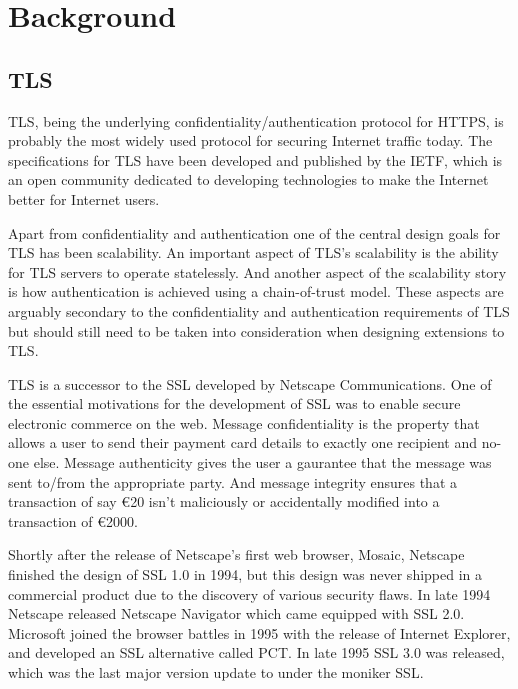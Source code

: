 \chapter{Background}

\section{TLS}

\ac{TLS}, being the underlying confidentiality/authentication protocol for \ac{HTTPS},
is probably the most widely used protocol for securing Internet traffic today.
The specifications for \ac{TLS} have been developed and published by the \ac{IETF},
which is an open community dedicated to developing technologies to make the Internet better
for Internet users.


Apart from confidentiality and authentication one of the central
design goals for \ac{TLS} has been scalability.
An important aspect of \ac{TLS}'s scalability is the ability
for \ac{TLS} servers to operate statelessly.
And another aspect of the scalability story is how
authentication is achieved using a chain-of-trust model.
These aspects are arguably secondary to the confidentiality and authentication
requirements of \ac{TLS} but should still need to be taken into consideration
when designing extensions to \ac{TLS}.

\ac{TLS} is a successor to the \ac{SSL} developed
by Netscape Communications.
One of the essential motivations for the development of \ac{SSL}
was to enable secure electronic commerce on the web.
Message confidentiality is the property that allows a user
to send their payment card details to exactly one recipient and no-one else.
Message authenticity gives the user a gaurantee that the message
was sent to/from the appropriate party.
And message integrity ensures that a transaction of say €20 isn't
maliciously or accidentally modified into a transaction of €2000.

Shortly after the release of Netscape's first web browser, Mosaic,
Netscape finished the design of \ac{SSL} 1.0 in 1994,
but this design was never shipped in a commercial product
due to the discovery of various security flaws.
In late 1994 Netscape released Netscape Navigator which
came equipped with \ac{SSL} 2.0.
Microsoft joined the browser battles in 1995 with the release
of Internet Explorer, and developed an \ac{SSL} alternative
called \ac{PCT}.
In late 1995 \ac{SSL} 3.0 was released, which was the last
major version update to under the moniker \ac{SSL}.

